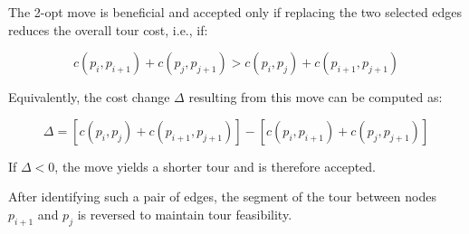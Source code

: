 The 2-opt move is beneficial and accepted only if replacing the two selected edges reduces the overall tour cost, i.e., if:

\begin{equation}
    c(p_i, p_{i+1}) + c(p_j, p_{j+1}) > c(p_i, p_j) + c(p_{i+1}, p_{j+1})
    \label{eq:2opt-condition}
\end{equation}

Equivalently, the cost change \(\Delta\) resulting from this move can be computed as:

\begin{equation}
    \Delta = [c(p_i, p_j) + c(p_{i+1}, p_{j+1})] - [c(p_i, p_{i+1}) + c(p_j, p_{j+1})]
    \label{eq:2opt-delta}
\end{equation}

If \(\Delta < 0\), the move yields a shorter tour and is therefore accepted.

After identifying such a pair of edges, the segment of the tour between nodes $p_{i+1}$ and $p_j$ is reversed to maintain tour feasibility.

